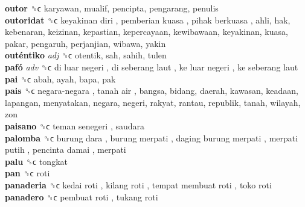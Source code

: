\textbf{outor} ␝ϲ  karyawan, mualif, pencipta, pengarang, penulis  \\
\textbf{outoridat} ␝ϲ   keyakinan diri ,  pemberian kuasa ,  pihak berkuasa , ahli, hak, kebenaran, keizinan, kepastian, kepercayaan, kewibawaan, keyakinan, kuasa, pakar, pengaruh, perjanjian, wibawa, yakin  \\
\textbf{outéntiko} \emph{adj}  ␝ϲ  otentik, sah, sahih, tulen  \\
\textbf{pafó} \emph{adv}  ␝ϲ   di luar negeri ,  di seberang laut ,  ke luar negeri ,  ke seberang laut   \\
\textbf{pai} ␝ϲ  abah, ayah, bapa, pak  \\
\textbf{pais} ␝ϲ   negara-negara ,  tanah air , bangsa, bidang, daerah, kawasan, keadaan, lapangan, menyatakan, negara, negeri, rakyat, rantau, republik, tanah, wilayah, zon  \\
\textbf{paisano} ␝ϲ   teman senegeri , saudara  \\
\textbf{palomba} ␝ϲ   burung dara ,  burung merpati ,  daging burung merpati ,  merpati putih ,  pencinta damai , merpati  \\
\textbf{palu} ␝ϲ  tongkat  \\
\textbf{pan} ␝ϲ  roti  \\
\textbf{panaderia} ␝ϲ   kedai roti ,  kilang roti ,  tempat membuat roti ,  toko roti   \\
\textbf{panadero} ␝ϲ   pembuat roti ,  tukang roti   \\
